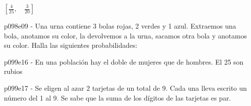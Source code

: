 \documentclass[spanish, 11pt]{exam}
\begin{document}
\begin{questions}
\begin{multicols}{2}
\begin{parts}
  \begin{solution}  $ \left [ \frac{4}{25}, \quad \frac{3}{20}\right ] $  \end{solution}
        \end{parts}
        \end{multicols}
        \question p098e09 - Una urna contiene 3 bolas rojas, 2 verdes y 1 azul. Extraemos una bola, anotamos su color, la devolvemos a
la urna, sacamos otra bola y anotamos su color. Halla las siguientes probabilidades:
        \begin{multicols}{2}
        \end{multicols}
        \question p099e16 - En una población hay el doble de mujeres que de hombres. 
El 25%
son rubios

        \begin{multicols}{2}
        \end{multicols}
        \question p099e17 - Se eligen al azar 2 tarjetas de un total de 9. Cada una lleva escrito un número del 1 al 9. Se sabe que la suma
de los dígitos de las tarjetas es par.


\end{questions}
\end{document}
